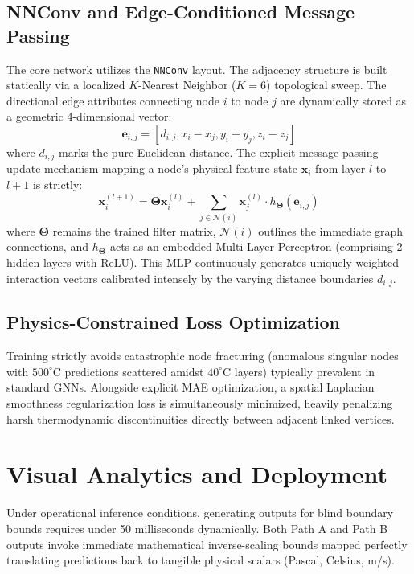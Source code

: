 \documentclass[conference]{IEEEtran}
\begin{document}
\subsection{NNConv and Edge-Conditioned Message Passing}
The core network utilizes the \texttt{NNConv} layout. The adjacency structure is built statically via a localized $K$-Nearest Neighbor ($K=6$) topological sweep. The directional edge attributes connecting node $i$ to node $j$ are dynamically stored as a geometric 4-dimensional vector:
\begin{equation}
    \mathbf{e}_{i,j} = \left[ d_{i,j}, x_i - x_j, y_i - y_j, z_i - z_j \right]
\end{equation}
where $d_{i,j}$ marks the pure Euclidean distance. The explicit message-passing update mechanism mapping a node's physical feature state $\mathbf{x}_i$ from layer $l$ to $l+1$ is strictly:
\begin{equation}
    \mathbf{x}_i^{(l+1)} = \mathbf{\Theta} \mathbf{x}_i^{(l)} + \sum_{j \in \mathcal{N}(i)} \mathbf{x}_j^{(l)} \cdot h_{\mathbf{\Theta}}(\mathbf{e}_{i,j})
\end{equation}
where $\mathbf{\Theta}$ remains the trained filter matrix, $\mathcal{N}(i)$ outlines the immediate graph connections, and $h_{\mathbf{\Theta}}$ acts as an embedded Multi-Layer Perceptron (comprising 2 hidden layers with ReLU). This MLP continuously generates uniquely weighted interaction vectors calibrated intensely by the varying distance boundaries $d_{i,j}$.

\subsection{Physics-Constrained Loss Optimization}
Training strictly avoids catastrophic node fracturing (anomalous singular nodes with $500^{\circ}$C predictions scattered amidst $40^{\circ}$C layers) typically prevalent in standard GNNs. Alongside explicit MAE optimization, a spatial Laplacian smoothness regularization loss is simultaneously minimized, heavily penalizing harsh thermodynamic discontinuities directly between adjacent linked vertices.

\section{Visual Analytics and Deployment}
Under operational inference conditions, generating outputs for blind boundary bounds requires under 50 milliseconds dynamically. Both Path A and Path B outputs invoke immediate mathematical inverse-scaling bounds mapped perfectly translating predictions back to tangible physical scalars (Pascal, Celsius, m/s). 
\end{document}
